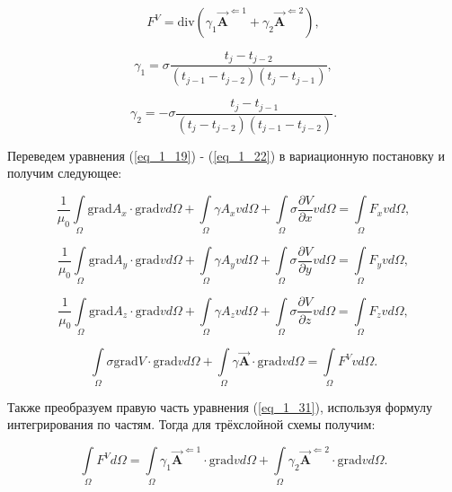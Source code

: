\begin{equation} \label{eq_1_25}
	F^V = \text{div}\left(\gamma_1 \overrightarrow{\textbf{A}}^{\Leftarrow 1} + \gamma_2 \overrightarrow{\textbf{A}}^{\Leftarrow 2}\right),
\end{equation}

\begin{equation} \label{eq_1_26}
	\gamma_1 = \sigma \frac{t_j - t_{j - 2}}{(t_{j - 1} - t_{j - 2})(t_{j} - t_{j - 1})},	
\end{equation}

\begin{equation} \label{eq_1_27}
	\gamma_2 = -\sigma \frac{t_j - t_{j - 1}}{(t_{j} - t_{j - 2})(t_{j - 1} - t_{j - 2})}.	
\end{equation}

Переведем уравнения (\ref{eq_1_19}) - (\ref{eq_1_22}) в вариационную постановку и получим следующее:

\begin{equation} \label{eq_1_28}
	\frac{1}{\mu_0} \int \limits_{\Omega} \text{grad} A_x \cdot \text{grad} v d\Omega + \int \limits_{\Omega} \gamma A_x v d \Omega + \int \limits_{\Omega} \sigma \frac{\partial V}{\partial x} v d \Omega = \int \limits_{\Omega} F_x v d \Omega,
\end{equation}

\begin{equation} \label{eq_1_29}
	\frac{1}{\mu_0} \int \limits_{\Omega} \text{grad} A_y \cdot \text{grad} v d\Omega + \int \limits_{\Omega} \gamma A_y v d \Omega + \int \limits_{\Omega} \sigma \frac{\partial V}{\partial y} v d \Omega = \int \limits_{\Omega} F_y v d \Omega,
\end{equation}

\begin{equation} \label{eq_1_30}
	\frac{1}{\mu_0} \int \limits_{\Omega} \text{grad} A_z \cdot \text{grad} v d\Omega + \int \limits_{\Omega} \gamma A_z v d \Omega + \int \limits_{\Omega} \sigma \frac{\partial V}{\partial z} v d \Omega = \int \limits_{\Omega} F_z v d \Omega,
\end{equation}

\begin{equation} \label{eq_1_31}
	\int \limits_{\Omega} \sigma \text{grad} V \cdot \text{grad} v d \Omega + \int \limits_{\Omega} \gamma \overrightarrow{\textbf{A}} \cdot \text{grad} v d \Omega = \int \limits_{\Omega} F^V v d \Omega.
\end{equation}

Также преобразуем правую часть уравнения (\ref{eq_1_31}), используя формулу интегрирования по частям. Тогда для трёхслойной схемы получим:

\begin{equation} \label{eq_1_32}
	\int \limits_{\Omega} F^V d \Omega = \int \limits_{\Omega} \gamma_1 \overrightarrow{\textbf{A}}^{\Leftarrow 1} \cdot \text{grad} v d \Omega + \int \limits_{\Omega} \gamma_2 \overrightarrow{\textbf{A}}^{\Leftarrow 2} \cdot \text{grad} v d \Omega.
\end{equation}



